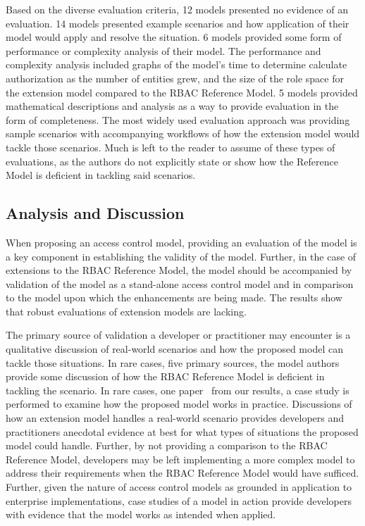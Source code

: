 Based on the diverse evaluation criteria, 12 models presented no evidence of an evaluation. 14 models presented example scenarios
and how application of their model would apply and resolve the situation.  6 models provided some form of performance
or complexity analysis of their model.  The performance and complexity analysis included graphs of the model's time to determine calculate authorization 
as the number of entities grew, and the size of the role space for the extension model compared to the RBAC Reference Model. 
5 models provided mathematical descriptions and analysis as a way to provide evaluation in the form of completeness. 
The most widely used evaluation approach was providing sample scenarios with accompanying workflows of how the extension model
would tackle those scenarios. Much is left to the reader to assume of these types of evaluations, as the authors do not explicitly state
or show how the Reference Model is deficient in tackling said scenarios.

\subsection{Analysis and Discussion}

When proposing an access control model, providing an evaluation of the model is a key component in establishing the validity of the model. 
Further, in the case of extensions to the RBAC Reference Model, the model should be accompanied by validation of the model as a stand-alone
access control model and in comparison to the model upon which the enhancements are being made. The results show that robust evaluations of
extension models are lacking. 

The primary source of validation a developer or practitioner may encounter is a qualitative discussion of real-world
scenarios and how the proposed model can tackle those situations. In rare cases, five primary sources, the model 
authors provide some discussion of how the RBAC Reference Model is deficient in tackling the scenario. In rare cases, 
one paper~\cite{motta03:contextual} from our results, a case study is performed to examine how the proposed model works in practice. Discussions
of how an extension model handles a real-world scenario provides developers and practitioners anecdotal evidence at best
for what types of situations the proposed model could handle. Further, by not providing a comparison to the RBAC Reference Model, developers may be left implementing a more complex model to address their requirements when the RBAC Reference Model would
have sufficed.  Further, given the nature of access control models as grounded in application to enterprise implementations, 
case studies of a model in action provide developers with evidence that the model works as intended when applied.

